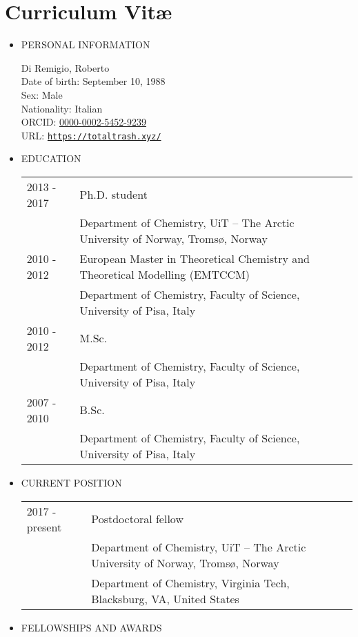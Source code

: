 \documentclass[notitlepage,a4paper,11pt]{article}
\begin{document}
\section*{Curriculum Vit\ae}\label{sec:curriculum-vitae}

\begin{itemize}
\item PERSONAL INFORMATION

Di Remigio, Roberto \\
Date of birth: September 10, 1988 \\
Sex: Male \\
Nationality: Italian \\
ORCID: \href{https://orcid.org/0000-0002-5452-9239}{0000-0002-5452-9239} \\
URL: \href{totaltrash.xyz/}{\texttt{https://totaltrash.xyz/}}

\item EDUCATION

  \begin{tabular}{ll}
2013 - 2017 & Ph.D. student \\
    & Department of Chemistry, UiT -- The Arctic University of Norway, Tromsø, Norway \\
2010 - 2012 & European Master in Theoretical Chemistry and Theoretical Modelling (EMTCCM) \\
    & Department of Chemistry, Faculty of Science, University of Pisa, Italy\\
2010 - 2012 & M.Sc. \\
    & Department of Chemistry, Faculty of Science, University of Pisa, Italy\\
2007 - 2010 & B.Sc. \\
    & Department of Chemistry, Faculty of Science, University of Pisa, Italy\\
  \end{tabular}

\item CURRENT POSITION

  \begin{tabular}{ll}
2017 - present & Postdoctoral fellow \\
    & Department of Chemistry, UiT -- The Arctic University of Norway, Tromsø, Norway \\
    & Department of Chemistry, Virginia Tech, Blacksburg, VA, United States \\
  \end{tabular}

\item FELLOWSHIPS AND AWARDS


\end{itemize}
\end{document}
